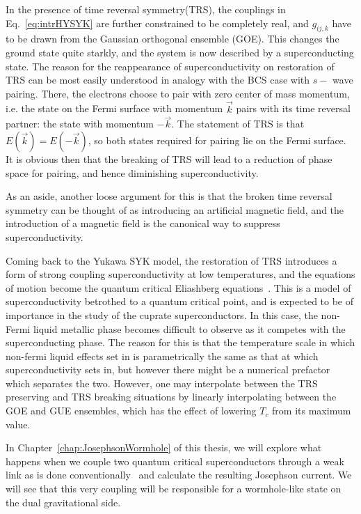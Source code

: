 \par
In the presence of time reversal symmetry(TRS), the couplings in Eq.~\eqref{eq:intrHYSYK} are further constrained to be completely real, and $g_{ij,k}$ have to be drawn from the Gaussian orthogonal ensemble (GOE). This changes the ground state quite starkly, and the system is now described by a superconducting state. 
The reason for the reappearance of superconductivity on restoration of TRS can be most easily understood in analogy with the BCS case with $s-$ wave pairing. There, the electrons choose to pair with zero center of mass momentum, i.e. the state on the Fermi surface with momentum $\vec{k}$ pairs with its time reversal partner: the state with momentum $-\vec{k}$. The statement of TRS is that $E(\vec{k}) = E(-\vec{k})$, so both states required for pairing lie on the Fermi surface. It is obvious then that the breaking of TRS will lead to a reduction of phase space for pairing, and hence diminishing superconductivity.
\par
As an aside, another loose argument for this is that the broken time reversal symmetry can be thought of as introducing an artificial magnetic field, and the introduction of a magnetic field is the canonical way to suppress superconductivity.  
\par 
Coming back to the Yukawa SYK model, the restoration of TRS introduces a form of strong coupling superconductivity at low temperatures, and the equations of motion become the quantum critical Eliashberg equations~\cite{metlitski2015cooper,chubukov2020interplay,abanov2020interplay,she2009bcs}. This is a model of superconductivity betrothed to a quantum critical point, and is expected to be of importance in the study of the cuprate superconductors.
In this case, the non-Fermi liquid metallic phase becomes difficult to observe as it competes with the superconducting phase. The reason for this is that the temperature scale in which non-fermi liquid effects set in is parametrically the same as that at which superconductivity sets in, but however there might be a numerical prefactor which separates the two. However, one may interpolate between the TRS preserving and TRS breaking situations by linearly interpolating between the GOE and GUE ensembles, which has the effect of lowering $T_c$ from its maximum value. 
\par
In Chapter~\ref{chap:JosephsonWormhole} of this thesis, we will explore what happens when we couple two quantum critical superconductors through a weak link as is done conventionally~\cite{ambegaokar1963tunneling} and calculate the resulting Josephson current. We will see that this very coupling will be responsible for a wormhole-like state on the dual gravitational side.
 
